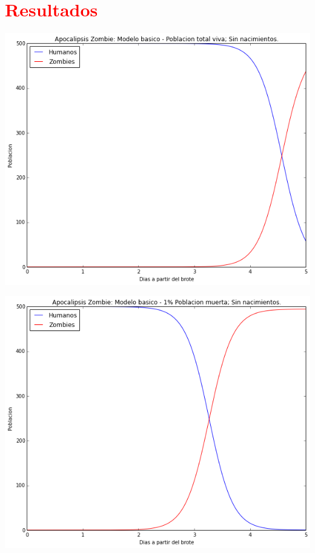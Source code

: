 \documentclass[12pt]{article}
\begin{document}
\section*{\textcolor{Red}{Resultados}}
\begin{center}
\includegraphics[scale=0.5]{act11b.png}\\
\end{center}
\begin{center}
\includegraphics[scale=0.5]{act11b1.png}\\
\end{center}
\end{document}
